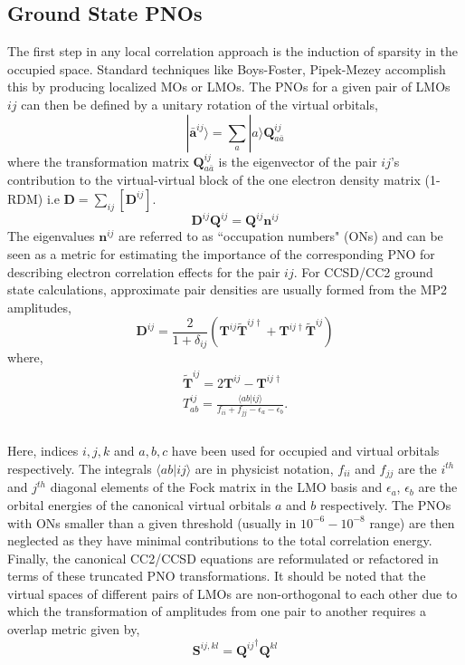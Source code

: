 \subsection{Ground State PNOs}
The first step in any local correlation approach is the induction of sparsity in the
occupied space. Standard techniques like Boys-Foster, Pipek-Mezey accomplish this by 
producing localized MOs or LMOs. The PNOs for a given pair of LMOs $ij$ can then be 
defined by a unitary rotation of the virtual orbitals,
\begin{equation}
|\bm{\bar{a}}^{ij}\rangle = \sum_a |a\rangle \bm{Q}^{ij}_{a\bar{a}}
\end{equation}
where the transformation matrix $\bm{Q}^{ij}_{a\bar{a}}$ is the eigenvector
of the pair $ij$'s contribution to the virtual-virtual block of the one
electron density matrix (1-RDM) i.e $\bm{D} = \sum\limits_{ij}[\bm{D}^{ij}]$.
\begin{equation}
\bm{D}^{ij} \bm{Q}^{ij} = \bm{Q}^{ij} \bm{n}^{ij}
\end{equation} 
The eigenvalues $\bm{n}^{ij}$ are referred to as ``occupation numbers" (ONs) and 
can be seen as a metric for estimating the importance of the corresponding PNO
for describing electron correlation effects for the pair $ij$. For CCSD/CC2 
ground state calculations, approximate pair densities are usually formed from 
the MP2 amplitudes,
\begin{equation}
\bm{D}^{ij} = \frac{2}{1+\delta_{ij}} (\bm{T}^{ij}\tilde{\bm{T}}^{ij\dagger} + \bm{T}^{ij\dagger}\tilde{\bm{T}}^{ij})
\end{equation}
where, 
\begin{equation}
\begin{split}
\tilde{\bm{T}}^{ij} = 2\bm{T}^{ij} - \bm{T}^{ij\dagger} \\
T^{ij}_{ab} = \frac{\langle ab|ij \rangle}{f_{ii} + f_{jj} - \epsilon_a - \epsilon_b}.\\
\end{split}
\end{equation} 
\\
Here, indices $i,j,k$ and $a,b,c$ have been used for occupied and virtual orbitals respectively. The 
integrals $\langle ab|ij \rangle$ are in physicist notation, $f_{ii}$ and $f_{jj}$ are the
$i^{th}$ and $j^{th}$ diagonal elements of the Fock matrix in the LMO basis and 
$\epsilon_a$, $\epsilon_b$ are the orbital energies of the canonical virtual orbitals
$a$ and $b$ respectively. The PNOs with ONs smaller than a given threshold (usually
in $10^{-6} - 10^{-8}$ range) are then neglected as they have minimal contributions
to the total correlation energy. Finally, the canonical CC2/CCSD equations are reformulated
or refactored in terms of these truncated PNO transformations. It should be noted that the virtual
spaces of different pairs of LMOs are non-orthogonal to each other due to which the transformation
of amplitudes from one pair to another requires a overlap metric given by, 
\begin{equation}
\bm{S}^{ij,kl} = {\bm{Q}^{ij}}^{\dagger} \bm{Q}^{kl}
\end{equation}
